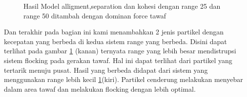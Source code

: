 \begin{figure}
\centering
{}
\caption{Hasil Model alligment,separation dan kohesi dengan range 25 dan range 50 ditambah dengan dominan force tawaf}
\label{fig:2grafikmodel4gaya}
\end{figure}

Dan terakhir pada bagian ini kami menambahkan 2 jenis partikel dengan kecepatan yang berbeda di kedua sistem range yang berbeda. Disini dapat terlihat pada gambar \ref{fig:2grafikmodel4gaya} (kanan) ternyata range yang lebih besar mendistrupsi sistem flocking pada gerakan tawaf. Hal ini dapat terlihat dari partikel yang tertarik menuju pusat. Hasil yang berbeda didapat dari sistem yang menggunakan range lebih kecil \ref{fig:2grafikmodel4gaya}(kiri). Partikel cenderung melakukan menyebar dalam area tawaf dan melakukan flocking dengan lebih optimal. 

